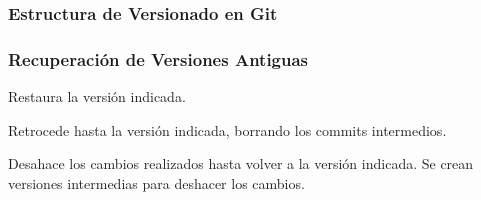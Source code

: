 \documentclass[animated,a4paper,slidestop,xcolor=pst,blue]{beamer}
\begin{document}
\begin{frame}[t]
	\frametitle{Estructura de Versionado en Git}
\end{frame}

\begin{frame}[c]
	\frametitle{Recuperación de Versiones Antiguas}
	 \begin{description}[<+->]
        \item[checkout] Restaura la versión indicada.
        \item[reset] Retrocede hasta la versión indicada, borrando los commits intermedios.
        \item[revert] Desahace los cambios realizados hasta volver a la versión indicada. Se crean versiones intermedias para deshacer los cambios.
	 \end{description}
\end{frame}
\end{document}
